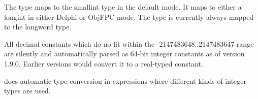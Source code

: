 The  type maps to the smallint type in the default
\fpc mode. It maps to either a longint in either Delphi or ObjFPC
mode. The  type is currently always mapped to the 
longword type. 

\begin{remark}
All decimal constants which do no fit within the -2147483648..2147483647 range 
are silently and automatically parsed as 64-bit integer constants as of version 
1.9.0. Earlier versions would convert it to a real-typed constant.
\end{remark}




\fpc does automatic type conversion in expressions where different kinds of
integer types are used.
% 
%
